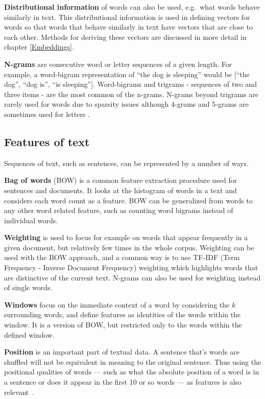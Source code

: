 \textbf{Distributional information} of words can also be used, e.g.\ what words behave similarly in text.
This distributional information is used in defining vectors for words so that words that behave similarly in text have vectors that are close to each other.
Methods for deriving these vectors are discussed in more detail in chapter \ref{Embeddings}.

\textbf{N-grams} are consecutive word or letter sequences of a given length.
For example, a word-bigram representation of ``the dog is sleeping'' would be [``the dog'', ``dog is'', ``is sleeping''].
Word-bigrams and trigrams - sequences of two and three items - are the most common of the n-grams.
N-grams beyond trigrams are rarely used for words due to sparsity issues although 4-grams and 5-grams are sometimes used for letters \cite{goldberg2017}.

\subsection{Features of text}\label{Features of text}
Sequences of text, such as sentences, can be represented by a number of ways.

\textbf{Bag of words} (BOW) is a common feature extraction procedure used for sentences and documents.
It looks at the histogram of words in a text and considers each word count as a feature.
BOW can be generalized from words to any other word related feature, such as counting word bigrams instead of individual words.

\textbf{Weighting} is used to focus for example on words that appear frequently in a given document, but relatively few times in the whole corpus.
Weighting can be used with the BOW approach, and a common way is to use TF-IDF (Term Frequency - Inverse Document Frequency) weighting which highlights words that are distinctive of the current text.
N-grams can also be used for weighting instead of single words.

\textbf{Windows} focus on the immediate context of a word by considering the $k$ surrounding words, and define features as identities of the words within the window.
It is a version of BOW, but restricted only to the words within the defined window.

\textbf{Position} is an important part of textual data.
A sentence that's words are shuffled will not be equivalent in meaning to the original sentence.
Thus using the positional qualities of words --- such as what the absolute position of a word is in a sentence or does it appear in the first 10 or so words --- as features is also relevant~\cite{goldberg2017}.

